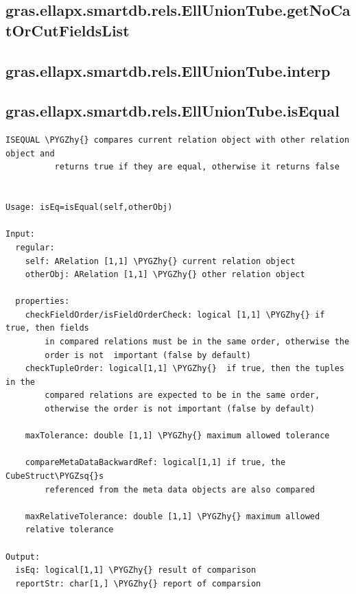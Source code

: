 \documentclass[letterpaper,10pt,english]{sphinxmanual}
\def\PYGZhy{\char`\-}
\def\PYGZsq{\char`\'}
\begin{document}
\subsection{gras.ellapx.smartdb.rels.EllUnionTube.getNoCatOrCutFieldsList}
\label{chap_functions:gras-ellapx-smartdb-rels-elluniontube-getnocatorcutfieldslist}

\subsection{gras.ellapx.smartdb.rels.EllUnionTube.interp}
\label{chap_functions:gras-ellapx-smartdb-rels-elluniontube-interp}

\subsection{gras.ellapx.smartdb.rels.EllUnionTube.isEqual}
\label{chap_functions:gras-ellapx-smartdb-rels-elluniontube-isequal}
\begin{Verbatim}[commandchars=\\\{\}]
ISEQUAL \PYGZhy{} compares current relation object with other relation object and
          returns true if they are equal, otherwise it returns false


Usage: isEq=isEqual(self,otherObj)

Input:
  regular:
    self: ARelation [1,1] \PYGZhy{} current relation object
    otherObj: ARelation [1,1] \PYGZhy{} other relation object

  properties:
    checkFieldOrder/isFieldOrderCheck: logical [1,1] \PYGZhy{} if true, then fields
        in compared relations must be in the same order, otherwise the
        order is not  important (false by default)
    checkTupleOrder: logical[1,1] \PYGZhy{}  if true, then the tuples in the
        compared relations are expected to be in the same order,
        otherwise the order is not important (false by default)

    maxTolerance: double [1,1] \PYGZhy{} maximum allowed tolerance

    compareMetaDataBackwardRef: logical[1,1] if true, the CubeStruct\PYGZsq{}s
        referenced from the meta data objects are also compared

    maxRelativeTolerance: double [1,1] \PYGZhy{} maximum allowed
    relative tolerance

Output:
  isEq: logical[1,1] \PYGZhy{} result of comparison
  reportStr: char[1,] \PYGZhy{} report of comparsion
\end{Verbatim}
\end{document}
